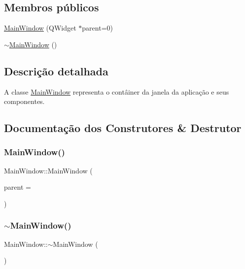 \subsection*{Membros públicos}
\begin{DoxyCompactItemize}
\item 
\hyperlink{class_main_window_a8b244be8b7b7db1b08de2a2acb9409db}{Main\+Window} (Q\+Widget $\ast$parent=0)
\item 
\hyperlink{class_main_window_ae98d00a93bc118200eeef9f9bba1dba7}{$\sim$\+Main\+Window} ()
\end{DoxyCompactItemize}


\subsection{Descrição detalhada}
A classe \hyperlink{class_main_window}{Main\+Window} representa o contâiner da janela da aplicação e seus componentes. 

\subsection{Documentação dos Construtores \& Destrutor}
\mbox{\label{class_main_window_a8b244be8b7b7db1b08de2a2acb9409db}} 
\subsubsection{\texorpdfstring{Main\+Window()}{MainWindow()}}
{\footnotesize\ttfamily Main\+Window\+::\+Main\+Window (\begin{DoxyParamCaption}\item[{Q\+Widget $\ast$}]{parent = {} }\end{DoxyParamCaption})\hspace{0.3cm}{\ttfamily [explicit]}}

\mbox{\label{class_main_window_ae98d00a93bc118200eeef9f9bba1dba7}} 
\subsubsection{\texorpdfstring{$\sim$\+Main\+Window()}{~MainWindow()}}
{\footnotesize\ttfamily Main\+Window\+::$\sim$\+Main\+Window (\begin{DoxyParamCaption}{ }\end{DoxyParamCaption})}



